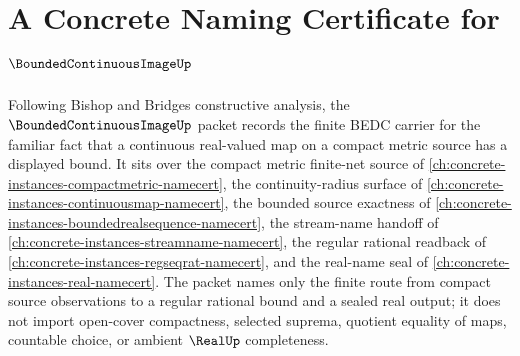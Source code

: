\chapter{A Concrete Naming Certificate for $\BoundedContinuousImageUp$}
\label{ch:concrete-instances-bounded-continuous-image-namecert}

Following Bishop and Bridges constructive analysis, the $\BoundedContinuousImageUp$ packet records the finite BEDC carrier for the familiar fact that a continuous real-valued map on a compact metric source has a displayed bound. It sits over the compact metric finite-net source of \autoref{ch:concrete-instances-compactmetric-namecert}, the continuity-radius surface of \autoref{ch:concrete-instances-continuousmap-namecert}, the bounded source exactness of \autoref{ch:concrete-instances-boundedrealsequence-namecert}, the stream-name handoff of \autoref{ch:concrete-instances-streamname-namecert}, the regular rational readback of \autoref{ch:concrete-instances-regseqrat-namecert}, and the real-name seal of \autoref{ch:concrete-instances-real-namecert}. The packet names only the finite route from compact source observations to a regular rational bound and a sealed real output; it does not import open-cover compactness, selected suprema, quotient equality of maps, countable choice, or ambient $\RealUp$ completeness.

